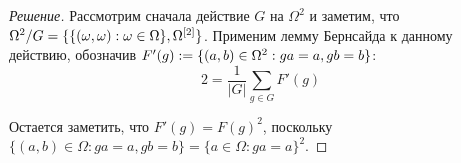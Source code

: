 \begin{proof}[Решение]
	Рассмотрим сначала действие $G$ на $\Omega^2$ и заметим, что $\Omega^2 / G = \{\{(\omega, \omega): \omega \hm\in \Omega\}, \Omega^{[2]}\}$. Применим лемму Бернсайда к данному действию, обозначив $F'(g) := \{(a, b) \hm\in \Omega^2: ga = a, gb = b\}$:
	\[2 = \frac{1}{|G|}\sum\limits_{g \in G}F'(g)\]
	
	Остается заметить, что $F'(g) = F(g)^2$, поскольку $\{(a, b) \in \Omega: ga = a, gb = b\} = \{a \in \Omega: ga = a\}^2$.
\end{proof}